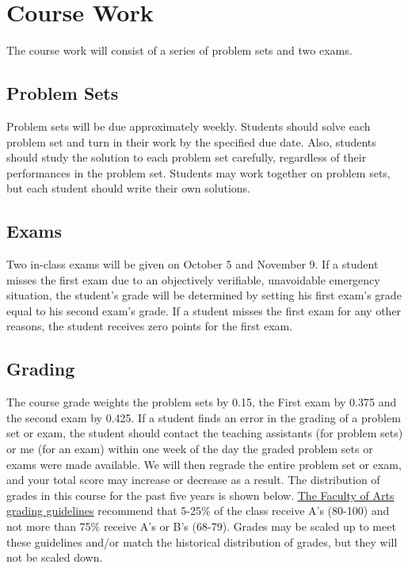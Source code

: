 \documentclass[10pt]{article}
\begin{document}
\section{Course Work}

The course work will consist of a series of problem sets and two
exams. 

\subsection{Problem Sets}
Problem sets will be due approximately weekly.  Students should solve
each problem set and turn in their work by the specified due
date. Also, students should study the solution to each problem set
carefully, regardless of their performances in the problem
set. Students may work together on problem sets, but each student
should write their own solutions.

\subsection{Exams}
Two in-class exams will be given on October 5 and November 9. If a
student misses the first exam due to an objectively verifiable,
unavoidable emergency situation, the student's grade will be
determined by setting his first exam's grade equal to his second
exam's grade. If a student misses the first exam for any other
reasons, the student receives zero points for the first exam. 

\subsection{Grading}
The course grade weights the problem sets by 0.15, the First exam by
0.375 and the second exam by 0.425. If a student finds an error in the
grading of a problem set or exam, the student should contact the
teaching assistants (for problem sets) or me (for an exam) within one
week of the day the graded problem sets or exams were made
available. We will then regrade the entire problem set or exam, and
your total score may increase or decrease as a result.  The
distribution of grades in this course for the past five years is shown
below.
\href{http://www.arts.ubc.ca/faculty-amp-staff/resources/courses-and-grading/grading-guidelines.html}
{The Faculty of Arts grading guidelines} recommend that 5-25\% of the
class receive A's (80-100) and not more than 75\% receive A's or B's
(68-79). Grades may be scaled up to meet these guidelines and/or match
the historical distribution of grades, but they will not be scaled
down.
\end{document}
